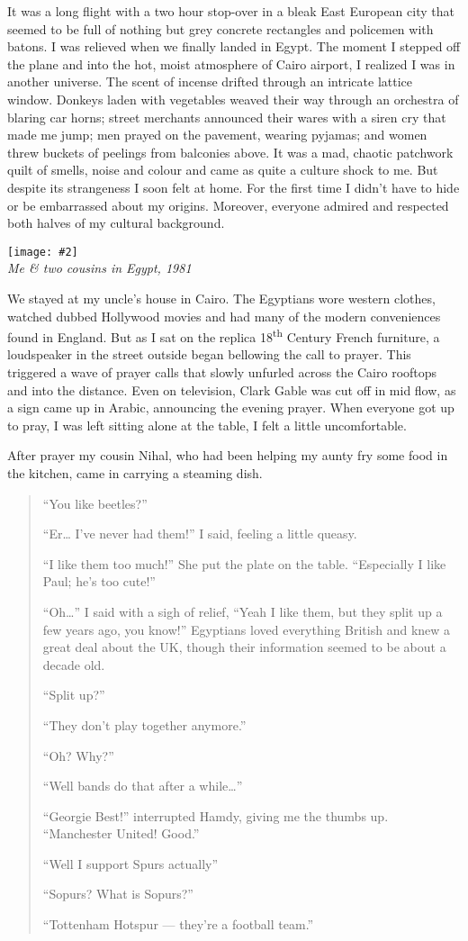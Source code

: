 \documentclass[12pt]{memoir}
\let \Sup=\textsuperscript
\newcommand{\img}[3]{\begin{center}%
\texttt{[image: \#2]}\\{\small\em#3}%
\end{center}}
\begin{document}
It was a long flight with a two hour stop-over
in a bleak East European city that seemed to be full of nothing
but grey concrete rectangles and policemen with batons.
I was relieved when we finally landed in Egypt.
The moment I stepped off the plane and into the hot,
moist atmosphere of Cairo airport,
I realized I was in another universe.
The scent of incense drifted through an intricate lattice window.
Donkeys laden with vegetables weaved their way
through an orchestra of blaring car horns;
street merchants announced their wares with a siren cry that made me jump;
men prayed on the pavement, wearing pyjamas;
and women threw buckets of peelings from balconies above.
It was a mad, chaotic patchwork quilt of smells,
noise and colour and came as quite a culture shock to me.
But despite its strangeness I soon felt at home.
For the first time I didn’t have to hide or be embarrassed about my origins.
Moreover, everyone admired and respected both halves of my cultural background.

\img{scale=0.3}{Hassan_Cousins.jpg}
{Me \& two cousins in Egypt, 1981}

We stayed at my uncle’s house in Cairo.
The Egyptians wore western clothes,
watched dubbed Hollywood movies
and had many of the modern conveniences found in England.
But as I sat on the replica 18\Sup{th} Century French furniture,
a loudspeaker in the street outside began bellowing the call to prayer.
This triggered a wave of prayer calls
that slowly unfurled across the Cairo rooftops and into the distance.
Even on television, Clark Gable was cut off in mid flow,
as a sign came up in Arabic, announcing the evening prayer.
When everyone got up to pray,
I was left sitting alone at the table,
I felt a little uncomfortable.

After prayer my cousin Nihal,
who had been helping my aunty fry some food in the kitchen,
came in carrying a steaming dish.

\begin{quote}
“You like beetles?”

“Er… I’ve never had them!” I said, feeling a little queasy.

“I like them too much!”
She put the plate on the table.
“Especially I like Paul; he’s too cute!”

“Oh…” I said with a sigh of relief,
“Yeah I like them, but they split up a few years ago, you know!”
Egyptians loved everything British and knew a great deal about the UK,
though their information seemed to be about a decade old.

“Split up?”

“They don’t play together anymore.”

“Oh? Why?”

“Well bands do that after a while…”

“Georgie Best!” interrupted Hamdy, giving me the thumbs up.
“Manchester United! Good.”

“Well I support Spurs actually”

“Sopurs? What is Sopurs?”

“Tottenham Hotspur — they’re a football team.”
\end{quote}
\end{document}
